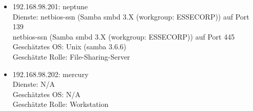 \documentclass[12pt,a4paper,titlepage,oneside]{scrartcl}
\begin{document}
\begin{itemize}
	\item 192.168.98.201: neptune
	\\Dienste: netbios-ssn (Samba smbd 3.X (workgroup: ESSECORP)) auf Port 139
	\\netbios-ssn (Samba smbd 3.X (workgroup: ESSECORP)) auf Port 445
	\\Geschätztes OS: Unix (samba 3.6.6)
	\\Geschätzte Rolle: File-Sharing-Server
	
	\item 192.168.98.202: mercury
	\\Dienste: N/A
	\\Geschätztes OS: N/A
	\\Geschätzte Rolle: Workstation
	
\end{itemize}
\end{document}
